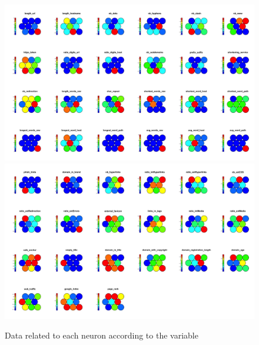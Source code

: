 \documentclass[12pt, a4paper]{article}
\begin{document}
      \begin{figure}[H]
        \centering
        \includegraphics[width=1\textwidth]{maps1.png}
        \includegraphics[width=1\textwidth]{maps2.png}
        \caption{Data related to each neuron according to the variable}
        \label{fig:maps.png}
      \end{figure}
\end{document}
